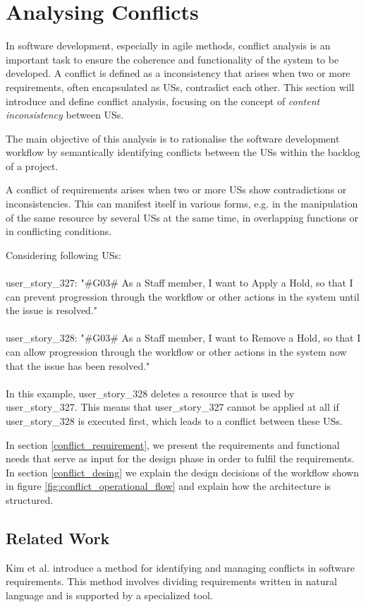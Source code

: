 \section{Analysing Conflicts}\label{conflict}
In software development, especially in agile methods, conflict analysis is an important task to ensure the coherence and functionality of the system to be developed. A conflict is defined as a inconsistency that arises when two or more requirements, often encapsulated as USs, contradict each other. This section will introduce and define conflict analysis, focusing on the concept of \textit{content inconsistency} between USs.

The main objective of this analysis is to rationalise the software development workflow by semantically identifying conflicts between the USs within the backlog of a project.

A conflict of requirements arises when two or more USs show contradictions or inconsistencies. This can manifest itself in various forms, e.g. in the manipulation of the same resource by several USs at the same time, in overlapping functions or in conflicting conditions.

\begin{example}
	Considering following USs:\\\\
	user\_story\_327: "\#G03\# As a Staff member, I want to Apply a Hold, so that I can prevent progression through the workflow or other actions in the system until the issue is resolved."\\\\
	user\_story\_328: "\#G03\# As a Staff member, I want to Remove a Hold, so that I can allow progression through the workflow or other actions in the system now that the issue has been resolved."\\\\
	In this example, user\_story\_328 deletes a resource that is used by user\_story\_327. This means that user\_story\_327 cannot be applied at all if user\_story\_328 is executed first, which leads to a conflict between these USs.
\end{example}

In section \ref{conflict_requirement}, we present the requirements and functional needs that serve as input for the design phase in order to fulfil the requirements. In section \ref{conflict_desing} we explain the design decisions of the workflow shown in figure \ref{fig:conflict_operational_flow} and explain how the architecture is structured. 
\subsection{Related Work}\label{conflict_related_work}
Kim et al. introduce a method for identifying and managing conflicts in software requirements. This method involves dividing requirements written in natural language and is supported by a specialized tool\cite{kim2007managing}.

